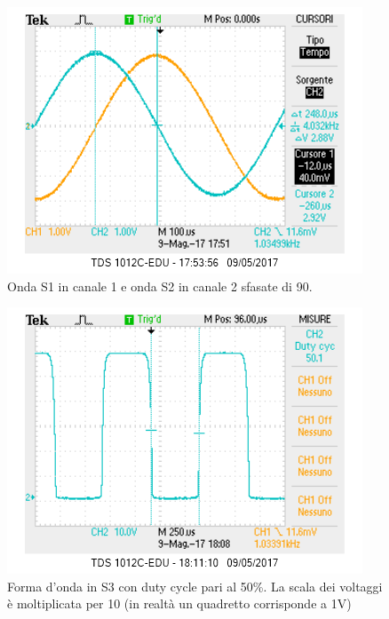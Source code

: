 \documentclass[10pt,a4paper]{article}
\begin{document}
 



\begin{figure}[!htb]
  \centering
  \includegraphics[scale=0.75]{sfasamento90.png}
\caption{Onda S1 in canale 1 e onda S2 in canale 2 sfasate di 90\degree.\label{osc:sfasamento}}
\end{figure}

\begin{figure}[!htb]
\centering
  \includegraphics[scale=0.75]{dutycycle50.png}
\caption{Forma d'onda in S3 con duty cycle pari al 50\%. La scala dei voltaggi è moltiplicata per 10 (in realtà un quadretto corrisponde a 1V) 
\label{osc:duty}}
\end{figure}
\end{document}
